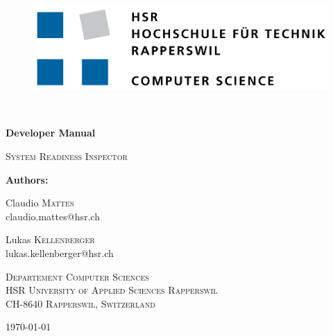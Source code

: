 \begin{titlepage}
	\centering
	\begin{figure}
		\centering
		\includegraphics[width=0.7\linewidth]{./assets/logo/hsr.png}  	
	\end{figure}
	\
	\vfill
	{\huge\bfseries Developer Manual\par}
	\vspace{5mm}
	{\scshape\Large System Readiness Inspector\par}
	\vfill

	{\Large\textbf{Authors:} \\\vspace{0.2cm}}
	{\Large Claudio \textsc{Mattes} \\\small claudio.mattes@hsr.ch \par\vspace{0.2cm}
	\Large Lukas \textsc{Kellenberger} \\\small lukas.kellenberger@hsr.ch}


	\vfill
	{\scshape\scriptsize Departement Computer Sciences \\ HSR University of Applied Sciences Rapperswil \\ CH-8640 Rapperswil, Switzerland \par}
	\vfill

    {\large \today}
\end{titlepage}